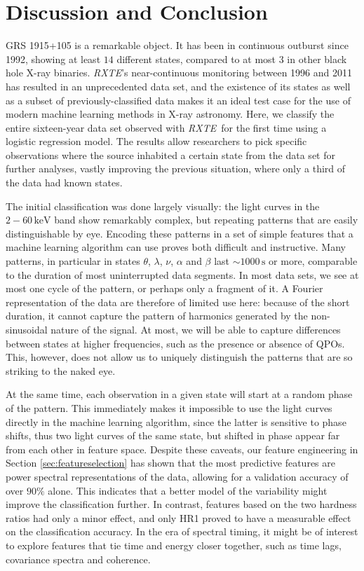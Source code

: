 \documentclass[12pt]{emulateapj}
\newcommand{\project}[1]{\textsl{#1}}
\newcommand{\rxte}{\project{RXTE}}
\begin{document}
\section{Discussion and Conclusion}

GRS 1915+105 is a remarkable object. It has been in continuous outburst since 1992, showing at least $14$ different states, compared to at most 
$3$ in other black hole X-ray binaries. \rxte's near-continuous monitoring between 1996 and 2011 has resulted in an unprecedented data set, and the 
existence of its states as well as a subset of previously-classified data makes it an ideal test case for the use of modern machine learning methods in X-ray astronomy. Here, we classify the entire sixteen-year data set observed with \rxte\ for the first time using a logistic regression model. 
The results allow researchers to pick specific observations where the source inhabited a certain state from the data set for further analyses, vastly improving 
the previous situation, where only a third of the data had known states.

The initial classification was done largely visually: the light curves in the $2-60\,\mathrm{keV}$ band show remarkably complex, but repeating patterns that are 
easily distinguishable by eye. Encoding these patterns in a set of simple features that a machine learning algorithm can use proves both difficult and instructive.
Many patterns, in particular in states $\theta$, $\lambda$, $\nu$, $\alpha$ and $\beta$ last $\sim 1000\,\mathrm{s}$ or more, comparable to the duration of most 
uninterrupted data segments. In most data sets, we see at most one cycle of the pattern, or perhaps only a fragment of it. A Fourier representation of the data are 
therefore of limited use here: because of the short duration, it cannot capture the pattern of harmonics generated by the non-sinusoidal nature of the signal. At 
most, we will be able to capture differences between states at higher frequencies, such as the presence or absence of QPOs. This, however, does not allow us to 
uniquely distinguish the patterns that are so striking to the naked eye. 

At the same time, each observation in a given state will start at a random phase of the pattern. This immediately makes it impossible to use the light curves directly 
in the machine learning algorithm, since the latter is sensitive to phase shifts, thus two light curves of the same state, but shifted in phase appear far 
from each other in feature space. Despite these caveats, our feature engineering in Section \ref{sec:featureselection} has shown that 
the most predictive features are power spectral representations of the data, allowing for a validation accuracy of over $90\%$ alone. This indicates that a better 
model of the variability might improve the classification further. In contrast, features based on the two hardness ratios had only a minor effect, and only HR1 proved 
to have a measurable effect on the classification accuracy. In the era of spectral timing, it might be of interest to explore features that tie time and energy closer 
together, such as time lags, covariance spectra and coherence.
\end{document}
